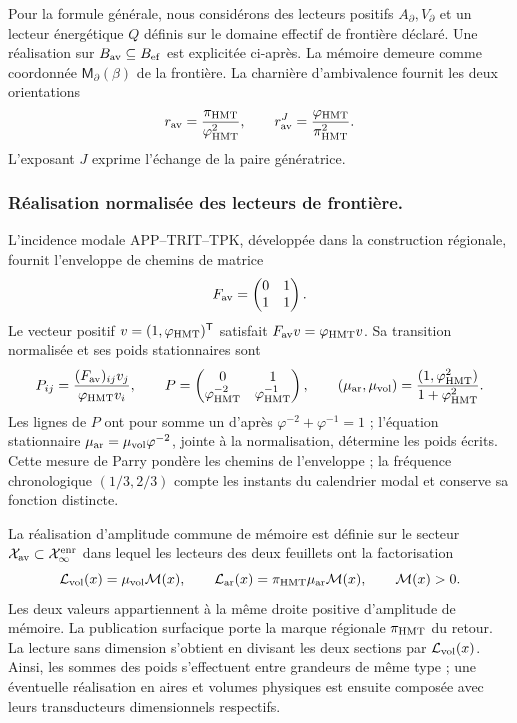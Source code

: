 Pour la formule générale, nous considérons des lecteurs positifs
\(A_\partial,V_\partial\) et un lecteur énergétique \(Q\)
définis sur le domaine effectif de frontière déclaré.
Une réalisation sur
\(B_{\rm av}\subseteq B_{\rm ef}\) est explicitée ci-après. La mémoire demeure comme coordonnée
\(\mathsf M_\partial(\beta)\) de la frontière. La charnière
d'ambivalence fournit les deux orientations
\[
 r_{\rm av}=\frac{\pi_{\rm HMT}}{\varphi_{\rm HMT}^2},\qquad
 r_{\rm av}^{J}=\frac{\varphi_{\rm HMT}}{\pi_{\rm HMT}^2}.
\]
L'exposant \(J\) exprime l'échange de la paire génératrice.
\subsubsection{Réalisation normalisée des lecteurs de frontière.}
L'incidence modale APP--TRIT--TPK, développée dans la construction régionale, fournit l'enveloppe de chemins de matrice
\[
 F_{\rm av}=\begin{pmatrix}0&1\\1&1\end{pmatrix}.
\]
Le vecteur positif \(v=(1,\varphi_{\rm HMT})^{\mathsf T}\) satisfait \(F_{\rm av}v=\varphi_{\rm HMT}v\). Sa transition normalisée et ses poids stationnaires sont
\begin{equation}
 P_{ij}=\frac{(F_{\rm av})_{ij}v_j}{\varphi_{\rm HMT}v_i},
 \qquad
 P=\begin{pmatrix}0&1\\
 \varphi_{\rm HMT}^{-2}&\varphi_{\rm HMT}^{-1}\end{pmatrix},
 \qquad
 (\mu_{\rm ar},\mu_{\rm vol})
 =\frac{(1,\varphi_{\rm HMT}^{2})}{1+\varphi_{\rm HMT}^{2}}.
 \label{x_reciprocidad:vii:eq:lectores-parry}
\end{equation}
Les lignes de \(P\) ont pour somme un d'après
\(\varphi^{-2}+\varphi^{-1}=1\) ; l'équation stationnaire
\(\mu_{\rm ar}=\mu_{\rm vol}\varphi^{-2}\), jointe à la
normalisation, détermine les poids écrits. Cette mesure de Parry
pondère les chemins de l'enveloppe ; la fréquence chronologique
\((1/3,2/3)\) compte les instants du calendrier modal et conserve
sa fonction distincte.

La réalisation d'amplitude commune de mémoire est définie sur le secteur
\(\mathcal X_{\rm av}\subset\mathcal X_\infty^{\rm enr}\) dans lequel
les lecteurs des deux feuillets ont la factorisation
\begin{equation}
 \mathcal L_{\rm vol}(x)=\mu_{\rm vol}\mathcal M(x),\qquad
 \mathcal L_{\rm ar}(x)=\pi_{\rm HMT}\mu_{\rm ar}\mathcal M(x),
 \qquad \mathcal M(x)>0.
 \label{x_reciprocidad:vii:eq:lectores-amplitud-comun}
\end{equation}
Les deux valeurs appartiennent à la même droite positive d'amplitude de mémoire. La publication surfacique porte la marque régionale \(\pi_{\rm HMT}\) du retour. La lecture sans dimension s'obtient en divisant les deux sections par \(\mathcal L_{\rm vol}(x)\). Ainsi, les sommes des poids s'effectuent entre grandeurs de même type ; une éventuelle réalisation en aires et volumes physiques est ensuite composée avec leurs transducteurs dimensionnels respectifs.

